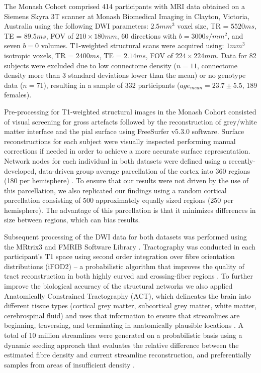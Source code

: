 The Monash Cohort comprised 414 participants with MRI data obtained on a Siemens Skyra 3T scanner at Monash Biomedical Imaging in Clayton, Victoria, Australia using the following DWI parameters: $2.5 mm^{3}$ voxel size, TR = $5520 ms$, TE = $89.5 ms$, FOV of $210 \times 180 mm$, 60 directions with $b = 3000 s/mm^{2}$, and seven $b = 0$ volumes. T1-weighted structural scans were acquired using: $1 mm^{3}$ isotropic voxels, TR = $2400 ms$, TE = $2.14 ms$, FOV of $224 \times 224 mm$. Data for 82 subjects were excluded due to low connectome density ($n = 11$, connectome density more than 3 standard deviations lower than the mean) or no genotype data ($n = 71$), resulting in a sample of 332 participants ($age_{mean} = 23.7 \pm 5.5$, 189 females).

Pre-processing for T1-weighted structural images in the Monash Cohort consisted of visual screening for gross artefacts followed by the reconstruction of grey/white matter interface and the pial surface using FreeSurfer v5.3.0 software. Surface reconstructions for each subject were visually inspected performing manual corrections if needed in order to achieve a more accurate surface representation. Network nodes for each individual in both datasets were defined using a recently-developed, data-driven group average parcellation of the cortex into 360 regions (180 per hemisphere) \citep{Glasser2016}. To ensure that our results were not driven by the use of this parcellation, we also replicated our findings using a random cortical parcellation consisting of 500 approximately equally sized regions (250 per hemisphere). The advantage of this parcellation is that it minimizes differences in size between regions, which can bias results.

Subsequent processing of the DWI data for both datasets was performed using the MRtrix3 \citep{Tournier2012} and FMRIB Software Library \citep{Jenkinson2012}. Tractography was conducted in each participant's T1 space using second order integration over fibre orientation distributions (iFOD2) -- a probabilistic algorithm that improves the quality of tract reconstruction in both highly curved and crossing-fiber regions \citep{Tournier2010}. To further improve the biological accuracy of the structural networks we also applied Anatomically Constrained Tractography (ACT), which delineates the brain into different tissue types (cortical grey matter, subcortical grey matter, white matter, cerebrospinal fluid) and uses that information to ensure that streamlines are beginning, traversing, and terminating in anatomically plausible locations \citep{Smith2012}. A total of 10 million streamlines were generated on a probabilistic basis using a dynamic seeding approach that evaluates the relative difference between the estimated fibre density and current streamline reconstruction, and preferentially samples from areas of insufficient density \citep{Smith2015a}.

